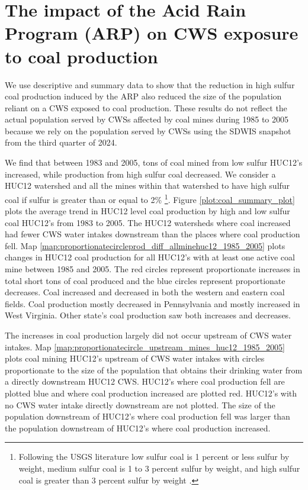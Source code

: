 \documentclass{article}
\begin{document}


\section{The impact of the Acid Rain Program (ARP) on CWS exposure to coal production}

We use descriptive and summary data to show that the reduction in high sulfur coal production induced by the ARP also reduced the size of the population reliant on a CWS exposed to coal production. These results do not reflect the actual population served by CWSs affected by coal mines during 1985 to 2005 because we rely on the population served by CWSs using the SDWIS snapshot from the third quarter of 2024.

We find that between 1983 and 2005, tons of coal mined from low sulfur HUC12's increased, while production from high sulfur coal decreased. We consider a HUC12 watershed and all the mines within that watershed to have high sulfur coal if sulfur is greater than or equal to 2\% \footnote{Following the USGS literature low sulfur coal is 1 percent or less sulfur by weight, medium sulfur coal is 1 to 3 percent sulfur by weight, and high sulfur coal is greater than 3 percent sulfur by weight \cite{schweinfurth2009introduction}.}. Figure \ref{plot:coal_summary_plot} plots the average trend in HUC12 level coal production by high and low sulfur coal HUC12's from 1983 to 2005. The HUC12 watersheds where coal increased had fewer CWS water intakes downstream than the places where coal production fell. Map \ref{map:proportionatecircleprod_diff_allminehuc12_1985_2005} plots changes in HUC12 coal production for all HUC12's with at least one active coal mine between 1985 and 2005. The red circles represent proportionate increases in total short tons of coal produced and the blue circles represent proportionate decreases. Coal increased and decreased in both the western and eastern coal fields. Coal production mostly decreased in Pennsylvania and mostly increased in West Virginia. Other state's coal production saw both increases and decreases.

The increases in coal production largely did not occur upstream of CWS water intakes. Map \ref{map:proportionatecircle_upstream_mines_huc12_1985_2005} plots coal mining HUC12's upstream of CWS water intakes with circles proportionate to the size of the population that obtains their drinking water from a directly downstream HUC12 CWS. HUC12's where coal production fell are plotted blue and where coal production increased are plotted red. HUC12's with no CWS water intake directly downstream are not plotted. The size of the population downstream of HUC12's where coal production fell was larger than the population downstream of HUC12's where coal production increased.
\end{document}
